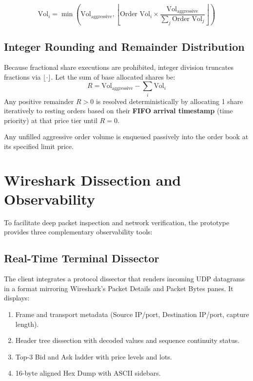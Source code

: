 \documentclass[11pt,a4paper]{article}
\begin{document}
\begin{equation}
\text{Vol}_i = \min\left(\text{Vol}_{\text{aggressive}}, \left\lfloor \text{Order Vol}_i \times \frac{\text{Vol}_{\text{aggressive}}}{\sum_j \text{Order Vol}_j} \right\rfloor\right)
\end{equation}

\subsection{Integer Rounding and Remainder Distribution}
Because fractional share executions are prohibited, integer division truncates fractions via $\lfloor \cdot \rfloor$. Let the sum of base allocated shares be:
\begin{equation}
R = \text{Vol}_{\text{aggressive}} - \sum_i \text{Vol}_i
\end{equation}
Any positive remainder $R > 0$ is resolved deterministically by allocating 1 share iteratively to resting orders based on their \textbf{FIFO arrival timestamp} (time priority) at that price tier until $R = 0$.

Any unfilled aggressive order volume is enqueued passively into the order book at its specified limit price.

\section{Wireshark Dissection and Observability}

To facilitate deep packet inspection and network verification, the prototype provides three complementary observability tools:

\subsection{Real-Time Terminal Dissector}
The client integrates a protocol dissector that renders incoming UDP datagrams in a format mirroring Wireshark's Packet Details and Packet Bytes panes. It displays:
\begin{enumerate}
    \item Frame and transport metadata (Source IP/port, Destination IP/port, capture length).
    \item Header tree dissection with decoded values and sequence continuity status.
    \item Top-3 Bid and Ask ladder with price levels and lots.
    \item 16-byte aligned Hex Dump with ASCII sidebars.
\end{enumerate}
\end{document}
